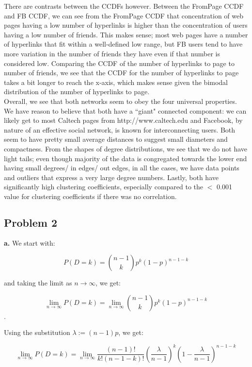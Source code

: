 \documentclass[12 pt]{article}
\begin{document}
	\noindent There are contrasts between the CCDFs however. Between the FromPage CCDF and FB CCDF, we can see from the FromPage CCDF that concentration of web pages having a low number of hyperlinks is higher than the concentration of users having a low number of friends. This makes sense; most web pages have a number of hyperlinks that fit within a well-defined low range, but FB users tend to have more variation in the number of friends they have even if that number is considered low. Comparing the CCDF of the number of hyperlinks to page to number of friends, we see that the CCDF for the number of hyperlinks to page takes a bit longer to reach the x-axis, which makes sense given the bimodal distribution of the number of hyperlinks to page. \\
	
	\noindent Overall,  we see that both networks seem to obey the four universal properties. We have reason to believe that both have a ``giant" connected component: we can likely get to most Caltech pages from http://www.caltech.edu and Facebook, by nature of an effective social network, is known for interconnecting users. Both seem to have pretty small average distances to suggest small diameters and compactness. From the shapes of degree distributions, we see that we do not have light tails; even though majority of the data is congregated towards the lower end having small degrees/ in edges/ out edges, in all the cases, we have data points and outliers that express a very large degree numbers. Lastly, both have significantly high clustering coefficients, especially compared to the $<$ 0.001 value for clustering coefficients if there was no correlation.
	
	\subsection*{Problem 2}
	\noindent \textbf{a.} We start with:
	
	\[ P(D = k) = \binom{n - 1}{k} p^k (1 - p)^{n - 1 - k} \]
	
	\noindent and taking the limit as $n \rightarrow \infty$, we get:
	
	\[ \lim_{n \rightarrow \infty} P(D = k) = \lim_{n \rightarrow \infty} 
	\binom{n - 1}{k} p^k (1 - p)^{n - 1 - k} \].
	
	\noindent Using the substitution $\lambda := (n-1)p$, we get:
	
	\[ \lim_{n \rightarrow \infty} P(D = k) = \lim_{n \rightarrow \infty} 
	\frac{(n - 1)!}{k!(n - 1 - k)!} (\frac{\lambda}{n - 1})^k (1 - \frac{\lambda}{n - 1})^{n - 1 - k} \]
	
\end{document}
